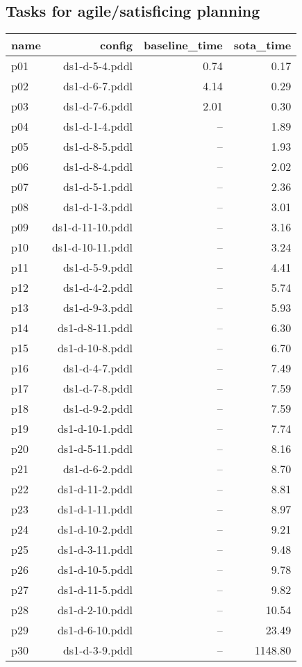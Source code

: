 \documentclass{article}
\begin{document}
                    \subsection*{Tasks for agile/satisficing planning}
                    
                            \begin{center}
                            \scriptsize
                            \begin{tabular}{@{}l|r|r|r@{}}
                            name & config & baseline\_time & sota\_time\\\midrule
                              p01& ds1-d-5-4.pddl&0.74&0.17\\
  p02& ds1-d-6-7.pddl&4.14&0.29\\
  p03& ds1-d-7-6.pddl&2.01&0.30\\
  p04& ds1-d-1-4.pddl&--&1.89\\
  p05& ds1-d-8-5.pddl&--&1.93\\
  p06& ds1-d-8-4.pddl&--&2.02\\
  p07& ds1-d-5-1.pddl&--&2.36\\
  p08& ds1-d-1-3.pddl&--&3.01\\
  p09& ds1-d-11-10.pddl&--&3.16\\
  p10& ds1-d-10-11.pddl&--&3.24\\
  p11& ds1-d-5-9.pddl&--&4.41\\
  p12& ds1-d-4-2.pddl&--&5.74\\
  p13& ds1-d-9-3.pddl&--&5.93\\
  p14& ds1-d-8-11.pddl&--&6.30\\
  p15& ds1-d-10-8.pddl&--&6.70\\
  p16& ds1-d-4-7.pddl&--&7.49\\
  p17& ds1-d-7-8.pddl&--&7.59\\
  p18& ds1-d-9-2.pddl&--&7.59\\
  p19& ds1-d-10-1.pddl&--&7.74\\
  p20& ds1-d-5-11.pddl&--&8.16\\
  p21& ds1-d-6-2.pddl&--&8.70\\
  p22& ds1-d-11-2.pddl&--&8.81\\
  p23& ds1-d-1-11.pddl&--&8.97\\
  p24& ds1-d-10-2.pddl&--&9.21\\
  p25& ds1-d-3-11.pddl&--&9.48\\
  p26& ds1-d-10-5.pddl&--&9.78\\
  p27& ds1-d-11-5.pddl&--&9.82\\
  p28& ds1-d-2-10.pddl&--&10.54\\
  p29& ds1-d-6-10.pddl&--&23.49\\
  p30& ds1-d-3-9.pddl&--&1148.80
                            \end{tabular}
                            \end{center}
                    
\end{document}
